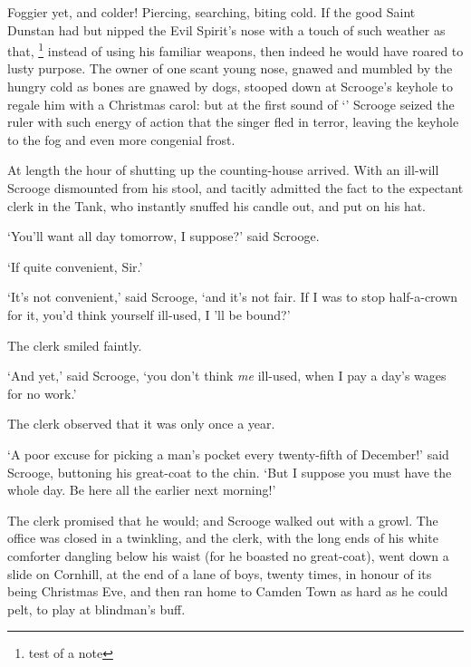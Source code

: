\documentclass[11pt,twoside]{article}\makeatletter
\begin{document}
Foggier yet, and colder!  Piercing, searching, biting cold. If the good Saint Dunstan had but nipped the Evil Spirit's nose with a touch of such weather as that, \footnote{test of a note} instead of using his familiar weapons, then indeed he would have roared to lusty purpose.  The owner of one scant young nose, gnawed and mumbled by the hungry cold as bones are gnawed by dogs, stooped down at Scrooge's keyhole to regale him with a Christmas carol: but at the first sound of  ‘’ Scrooge seized the ruler with such energy of action that the singer fled in terror, leaving the keyhole to the fog and even more congenial frost.  \par
At length the hour of shutting up the counting-house arrived.  With an ill-will Scrooge dismounted from his stool, and tacitly admitted the fact to the expectant clerk in the Tank, who instantly snuffed his candle out, and put on his hat.  \par
‘You'll want all day tomorrow, I suppose?’ said Scrooge.  \par
           ‘If quite convenient, Sir.’         \par
‘It's not convenient,’ said Scrooge, ‘and it's not fair. If I was to stop half-a-crown for it, you'd think yourself ill-used, I 'll be bound?’  \par
The clerk smiled faintly.  \par
‘And yet,’ said Scrooge, ‘you don't think \textit{me} ill-used, when I pay a day's wages for no work.’  \par
The clerk observed that it was only once a year.  \par
‘A poor excuse for picking a man's pocket every twenty-fifth of December!’ said Scrooge, buttoning his great-coat to the chin.  ‘But I suppose you must have the whole day. Be here all the earlier next morning!’   \par
The clerk promised that he would; and Scrooge walked out with a growl.  The office was closed in a twinkling, and the clerk, with the long ends of his white comforter dangling below his waist (for he boasted no great-coat), went down a slide on Cornhill, at the end of a lane of boys, twenty times, in honour of its being Christmas Eve, and then ran home to Camden Town as hard as he could pelt, to play at blindman's buff.  \par
\end{document}

